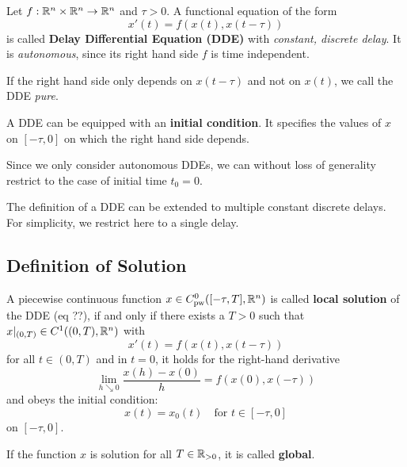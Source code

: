 \documentclass[10pt]{article}
\begin{document}
\begin{definition}
    Let $f:\mathbb{R}^n\times\mathbb{R}^n\rightarrow\mathbb{R}^n$ and $\tau > 0$.
    A functional equation of the form
    \begin{equation}
        x'(t) = f\left(x(t),x(t-\tau)\right)
    \end{equation}
    is called \textbf{Delay Differential Equation (DDE)} with \emph{constant, discrete delay}. It is \emph{autonomous}, since its right hand side $f$ is time independent.

    If the right hand side only depends on $x(t-\tau)$ and not on $x(t)$, we call the DDE \emph{pure}.

    A DDE can be equipped with an \textbf{initial condition}. It specifies the values of $x$ on $[-\tau, 0]$ on which the right hand side depends.

\end{definition}

Since we only consider autonomous DDEs, we can without loss of generality restrict to the case of initial time $t_0=0$.

The definition of a DDE can be extended to multiple constant discrete delays. For simplicity, we restrict here to a single delay.

\subsection{Definition of Solution}\label{definition-of-solution}

\begin{definition}
A piecewise continuous function $x\in C^0_\text{pw}([-\tau,T],\mathbb{R}^n)$ is called \textbf{local solution} of the DDE (eq ??), if and only if there exists a $T>0$ such that $x|_{(0,T)}\in C^1((0,T),\mathbb{R}^n)$ with
\begin{equation}
    x'(t) = f\left(x(t),x(t-\tau)\right)
\end{equation}
for all $t\in (0,T)$ and in $t=0$, it holds for the right-hand derivative \begin{equation}
    \lim_{h\searrow 0}\frac{x(h)-x(0)}{h}=f(x(0),x(-\tau))
\end{equation}
and obeys the initial condition:
\begin{equation}
    x(t) = x_0(t) \quad\text{for } t\in [-\tau,0]
\end{equation}
on $[-\tau,0]$.



If the function $x$ is solution for all $T\in\mathbb{R}_{>0}$, it is called \textbf{global}.

\end{definition}
\end{document}
